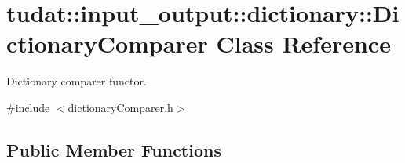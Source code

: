 \hypertarget{classtudat_1_1input__output_1_1dictionary_1_1DictionaryComparer}{}\section{tudat\+:\+:input\+\_\+output\+:\+:dictionary\+:\+:Dictionary\+Comparer Class Reference}
\label{classtudat_1_1input__output_1_1dictionary_1_1DictionaryComparer}


Dictionary comparer functor.  




{\ttfamily \#include $<$dictionary\+Comparer.\+h$>$}

\subsection*{Public Member Functions}
